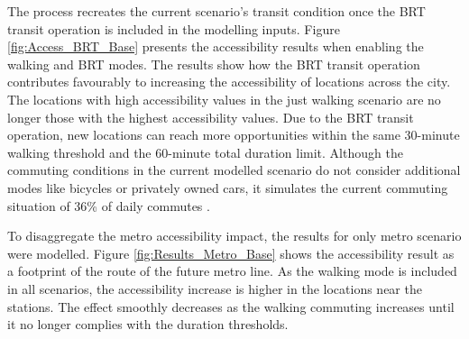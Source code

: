 \documentclass[12pt, a4paper]{report}
\begin{document}
The process recreates the current scenario's transit condition once the BRT transit operation is included in the modelling inputs. Figure \ref{fig:Access_BRT_Base} presents the accessibility results when enabling the walking and BRT modes. The results show how the BRT transit operation contributes favourably to increasing the accessibility of locations across the city. The locations with high accessibility values in the just walking scenario are no longer those with the highest accessibility values. Due to the BRT transit operation, new locations can reach more opportunities within the same 30-minute walking threshold and the 60-minute total duration limit. Although the commuting conditions in the current modelled scenario do not consider additional modes like bicycles or privately owned cars, it simulates the current commuting situation of 36\% of daily commutes \citep{alcaldiadebogotad.c.EncuestaMovilidad20192019}.

To disaggregate the metro accessibility impact, the results for only metro scenario were modelled. Figure \ref{fig:Results_Metro_Base} shows the accessibility result as a footprint of the route of the future metro line. As the walking mode is included in all scenarios, the accessibility increase is higher in the locations near the stations. The effect smoothly decreases as the walking commuting increases until it no longer complies with the duration thresholds.
\end{document}
